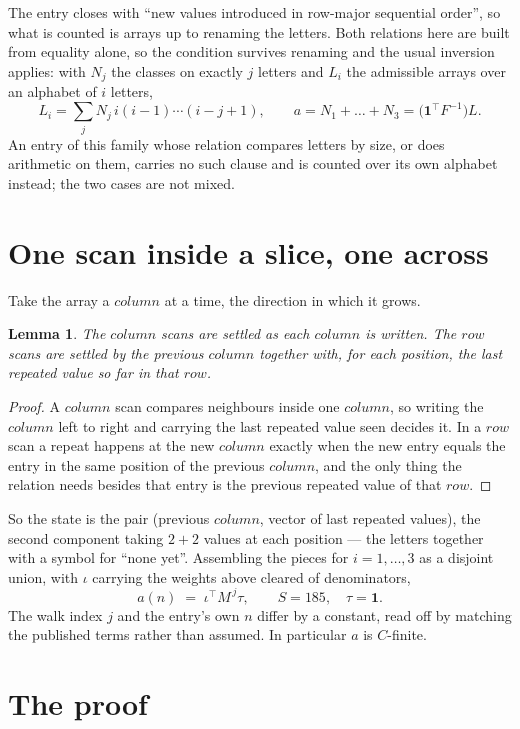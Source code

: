 \documentclass[11pt,a4paper]{article}
\theoremstyle{plain}
\newtheorem{lemma}[theorem]{Lemma}
\theoremstyle{definition}
\begin{document}
The entry closes with ``new values introduced in row-major sequential order'', so what is
counted is arrays up to renaming the letters. Both relations here are built from equality
alone, so the condition survives renaming and the usual inversion applies: with $N_j$ the
classes on exactly $j$ letters and $L_i$ the admissible arrays over an alphabet of $i$ letters,
\[
L_i=\sum_j N_j\,i(i-1)\cdots(i-j+1),\qquad
a=N_1+\dots+N_{3}=\bigl(\mathbf{1}^{\!\top}F^{-1}\bigr)L .
\]
An entry of this family whose relation compares letters by size, or does arithmetic on them,
carries no such clause and is counted over its own alphabet instead; the two cases are not
mixed.

\section{One scan inside a slice, one across}

Take the array a $column$ at a time, the direction in which it grows.

\begin{lemma}\label{lem:state}
The $column$ scans are settled as each $column$ is written. The $row$ scans are
settled by the previous $column$ together with, for each position, the last repeated value
so far in that $row$.
\end{lemma}

\begin{proof}
A $column$ scan compares neighbours inside one $column$, so writing the
$column$ left to right and carrying the last repeated value seen decides it. In a
$row$ scan a repeat happens at the new $column$ exactly when the new entry equals the
entry in the same position of the previous $column$, and the only thing the relation needs
besides that entry is the previous repeated value of that $row$.
\end{proof}

So the state is the pair (previous $column$, vector of last repeated values), the second
component taking $2+2$ values at each position --- the letters together with a symbol for
``none yet''. Assembling the pieces for $i=1,\dots,3$ as a disjoint union, with $\iota$ carrying the weights above cleared of denominators,
\[
a(n)\;=\;\iota^{\!\top}M^{\,j}\tau ,\qquad S=185,\quad\tau=\mathbf{1} .
\]
The walk index $j$ and the entry's own $n$ differ by a constant, read off by matching the
published terms rather than assumed. In particular $a$ is $C$-finite.

\section{The proof}
\end{document}
